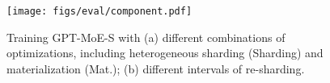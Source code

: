 \begin{figure}[htbp]
    \centering
    \texttt{[image: figs/eval/component.pdf]}
    \captionsetup{justification=raggedright}
    \caption{Training GPT-MoE-S with (a) different combinations of optimizations, including heterogeneous sharding (Sharding) and materialization (Mat.);
    (b) different intervals of re-sharding.
    }
    \captionsetup{justification=centering}
    \label{fig:component}
\end{figure}

